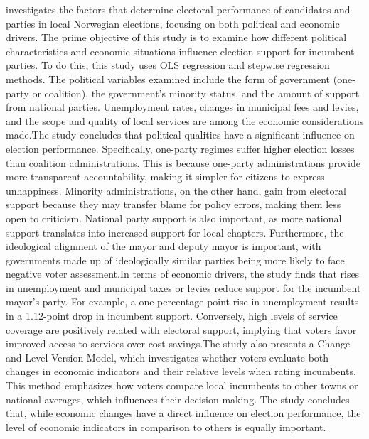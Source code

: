  investigates the factors that determine electoral performance of candidates and parties in local Norwegian elections, focusing on both political and economic drivers. The prime objective of this study is to examine how different political characteristics and economic situations influence election support for incumbent parties. To do this, this study uses OLS regression and stepwise regression methods. The political variables examined include the form of government (one-party or coalition), the government's minority status, and the amount of support from national parties. Unemployment rates, changes in municipal fees and levies, and the scope and quality of local services are among the economic considerations made.The study concludes that political qualities have a significant influence on election performance. Specifically, one-party regimes suffer higher election losses than coalition administrations. This is because one-party administrations provide more transparent accountability, making it simpler for citizens to express unhappiness. Minority administrations, on the other hand, gain from electoral support because they may transfer blame for policy errors, making them less open to criticism. National party support is also important, as more national support translates into increased support for local chapters. Furthermore, the ideological alignment of the mayor and deputy mayor is important, with governments made up of ideologically similar parties being more likely to face negative voter assessment.In terms of economic drivers, the study finds that rises in unemployment and municipal taxes or levies reduce support for the incumbent mayor's party. For example, a one-percentage-point rise in unemployment results in a 1.12-point drop in incumbent support. Conversely, high levels of service coverage are positively related with electoral support, implying that voters favor improved access to services over cost savings.The study also presents a Change and Level Version Model, which investigates whether voters evaluate both changes in economic indicators and their relative levels when rating incumbents. This method emphasizes how voters compare local incumbents to other towns or national averages, which influences their decision-making. The study concludes that, while economic changes have a direct influence on election performance, the level of economic indicators in comparison to others is equally important.\par
